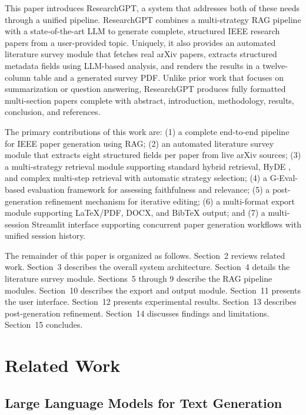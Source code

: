 \documentclass[12pt, a4paper]{article}
\begin{document}
This paper introduces ResearchGPT, a system that addresses both of these needs
through a unified pipeline. ResearchGPT combines a multi-strategy RAG pipeline
with a state-of-the-art LLM to generate complete, structured IEEE research papers
from a user-provided topic. Uniquely, it also provides an automated literature
survey module that fetches real arXiv papers, extracts structured metadata fields
using LLM-based analysis, and renders the results in a twelve-column table and
a generated survey PDF. Unlike prior work that focuses on summarization or question
answering, ResearchGPT produces fully formatted multi-section papers complete with
abstract, introduction, methodology, results, conclusion, and references.

The primary contributions of this work are: (1) a complete end-to-end pipeline
for IEEE paper generation using RAG; (2) an automated literature survey module
that extracts eight structured fields per paper from live arXiv sources; (3) a
multi-strategy retrieval module supporting standard hybrid retrieval, HyDE
\cite{gao2022}, and complex multi-step retrieval with automatic strategy selection;
(4) a G-Eval-based \cite{liu2023} evaluation framework for assessing faithfulness
and relevance; (5) a post-generation refinement mechanism for iterative editing;
(6) a multi-format export module supporting LaTeX/PDF, DOCX, and BibTeX output;
and (7) a multi-session Streamlit interface supporting concurrent paper generation
workflows with unified session history.

The remainder of this paper is organized as follows. Section~2 reviews related
work. Section~3 describes the overall system architecture. Section~4 details the
literature survey module. Sections~5 through 9 describe the RAG pipeline modules.
Section~10 describes the export and output module. Section~11 presents the user
interface. Section~12 presents experimental results. Section~13 describes
post-generation refinement. Section~14 discusses findings and limitations.
Section~15 concludes.

\section{Related Work}

\subsection{Large Language Models for Text Generation}
\end{document}
